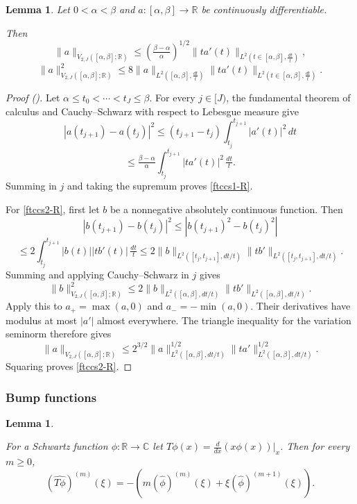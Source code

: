 \documentclass[12pt,reqno]{amsart}
\newcommand{\auto}{{({\tiny\faCar})}}
\theoremstyle{plain}
\newtheorem{lemma}[theorem]{Lemma}
\numberwithin{equation}{section}
\theoremstyle{remark}
\newcommand{\uses}[1]{}
\newcommand{\usesdefs}[1]{}
\newcommand{\leanok}{}
\newcommand{\lean}[1]{}
\newcommand{\R}{{\mathbb R}}
\begin{document}
\begin{lemma}\label{lem:ftccs-R}\uses{}\usesdefs{}   Let $0<\alpha < \beta$ and $a:[\alpha,\beta]\to \R$ be continuously differentiable.
\lean{Auto.ftcCsR}
\leanok
    Then
\begin{equation}\label{ftccs1-R}
\|a\|_{V_{2,J}([\alpha, \beta]; \R)} \le (\tfrac{\beta-\alpha}{\alpha})^{1/2} \|ta'(t)\|_{L^2(t\in [\alpha, \beta],\tfrac{dt}{t})}, \end{equation}
\begin{equation}\label{ftccs2-R}
\|a\|_{V_{2,J}([\alpha, \beta]; \R)}^2 \le 8 \|a\|_{L^2([\alpha, \beta],\tfrac{dt}{t})}\|ta'(t)\|_{L^2(t\in [\alpha, \beta],\tfrac{dt}{t})}.
\end{equation}
\end{lemma}
\begin{proof}[Proof \auto]
Let $\alpha\le t_0<\cdots<t_J\le\beta$. For every $j\in[J)$, the fundamental theorem of calculus and Cauchy--Schwarz with respect to Lebesgue measure give
\[
|a(t_{j+1})-a(t_j)|^2
\le
(t_{j+1}-t_j)\int_{t_j}^{t_{j+1}}|a'(t)|^2\,dt
\]
\[
\le
\tfrac{\beta-\alpha}{\alpha}
\int_{t_j}^{t_{j+1}}|ta'(t)|^2\,\tfrac{dt}{t}.
\]
Summing in $j$ and taking the supremum proves \eqref{ftccs1-R}.

For \eqref{ftccs2-R}, first let $b$ be a nonnegative absolutely continuous function. Then
\[
|b(t_{j+1})-b(t_j)|^2
\le
|b(t_{j+1})^2-b(t_j)^2|
\]
\[
\le
2\int_{t_j}^{t_{j+1}}|b(t)||tb'(t)|\,\tfrac{dt}{t}
\le
2\|b\|_{L^2([t_j,t_{j+1}],dt/t)}
\|tb'\|_{L^2([t_j,t_{j+1}],dt/t)}.
\]
Summing and applying Cauchy--Schwarz in $j$ gives
\[
\|b\|_{V_{2,J}([\alpha,\beta];\R)}^2
\le
2\|b\|_{L^2([\alpha,\beta],dt/t)}
\|tb'\|_{L^2([\alpha,\beta],dt/t)}.
\]
Apply this to $a_+=\max(a,0)$ and $a_-=-\min(a,0)$. Their derivatives have modulus at most $|a'|$ almost everywhere. The triangle inequality for the variation seminorm therefore gives
\[
\|a\|_{V_{2,J}([\alpha,\beta];\R)}
\le
2^{3/2}\|a\|_{L^2([\alpha,\beta],dt/t)}^{1/2}
\|ta'\|_{L^2([\alpha,\beta],dt/t)}^{1/2}.
\]
Squaring proves \eqref{ftccs2-R}.
\end{proof}

\subsubsection{Bump functions}\label{sec:bump red}

\begin{lemma}\label{lem:ft_deriv_mul}\uses{}\usesdefs{}
\lean{Auto.fourierDerivativeMul}
\leanok
For a Schwartz function $\phi:\mathbb{R}\to\mathbb{C}$ let
$T\phi(x)=\frac{d}{dx} (x \phi(x))|_x$. Then
for every $m\ge 0$,
\begin{equation}\label{auto:Fourier-derivatives-of-T}(\widehat{T\phi})^{(m)}(\xi) = -(m (\widehat{\phi})^{(m)}(\xi) + \xi (\widehat{\phi})^{(m+1)}(\xi)).\end{equation}
\end{lemma}
\end{document}
